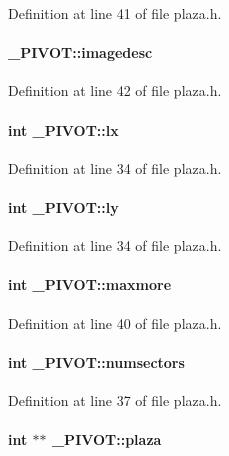 Definition at line 41 of file plaza.h.\label{_PIVOT_m14}
\paragraph{ \_\-PIVOT::imagedesc}\hfill



Definition at line 42 of file plaza.h.\label{_PIVOT_m2}
\paragraph{\setlength{\rightskip}{0pt plus 5cm}int \_\-PIVOT::lx}\hfill



Definition at line 34 of file plaza.h.\label{_PIVOT_m3}
\paragraph{\setlength{\rightskip}{0pt plus 5cm}int \_\-PIVOT::ly}\hfill



Definition at line 34 of file plaza.h.\label{_PIVOT_m12}
\paragraph{\setlength{\rightskip}{0pt plus 5cm}int \_\-PIVOT::maxmore}\hfill



Definition at line 40 of file plaza.h.\label{_PIVOT_m9}
\paragraph{\setlength{\rightskip}{0pt plus 5cm}int \_\-PIVOT::numsectors}\hfill



Definition at line 37 of file plaza.h.\label{_PIVOT_m10}
\paragraph{\setlength{\rightskip}{0pt plus 5cm}int $\ast$$\ast$ \_\-PIVOT::plaza}\hfill



